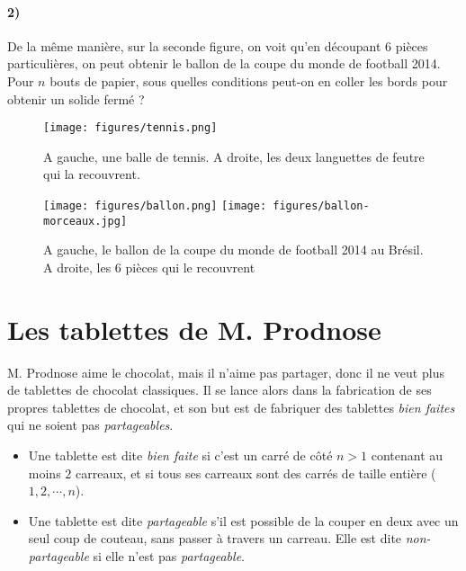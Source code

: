 \documentclass[a4paper,10pt,oneside]{article}
\begin{document}
\paragraph*{2)}
De la même manière, sur la seconde figure, on voit qu'en découpant 6 pièces particulières, on peut obtenir le ballon de la coupe du monde de football 2014.
Pour $n$ bouts de papier, sous quelles conditions peut-on en coller les bords pour obtenir un solide fermé ?


\vspace{3cm}
\begin{figure}[!ht]
  \centering
  \texttt{[image: figures/tennis.png]}
  \caption*{A gauche, une balle de tennis.
  A droite, les deux languettes de feutre qui la recouvrent.}
\end{figure}



\vspace{3cm}
\begin{figure}[!ht]
  \centering
  \texttt{[image: figures/ballon.png]}
  \hspace{1cm}
  \texttt{[image: figures/ballon-morceaux.jpg]}
  \caption*{A gauche, le ballon de la coupe du monde de football 2014 au Brésil.
  A droite, les 6 pièces qui le recouvrent}
\end{figure}



\clearpage
\section{Les tablettes de M. Prodnose}

M. Prodnose aime le chocolat, mais il n'aime pas partager, donc il ne veut plus de tablettes de chocolat classiques.
Il se lance alors dans la fabrication de ses propres tablettes de chocolat, et son but est de fabriquer des tablettes \textit{bien faites} qui ne soient pas \textit{partageables}.
\begin{itemize}
  \item Une tablette est dite \textit{bien faite} si c'est un carré de côté $n>1$ contenant au moins $2$ carreaux, et si tous ses carreaux sont des carrés de taille entière ($1,2,\cdots, n$).
  \item Une tablette est dite \textit{partageable} s'il est possible de la couper en deux avec un seul coup de couteau, sans passer à travers un carreau.
  Elle est dite \textit{non-partageable} si elle n'est pas \textit{partageable}.
\end{itemize}
\end{document}
